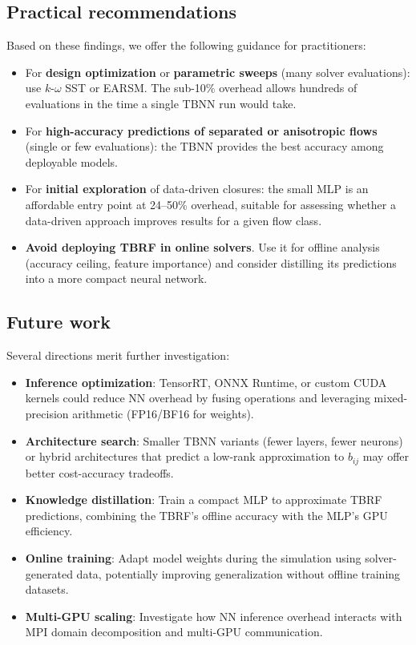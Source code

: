 \subsection{Practical recommendations}

Based on these findings, we offer the following guidance for practitioners:

\begin{itemize}
    \item For \textbf{design optimization} or \textbf{parametric sweeps} (many solver evaluations): use $k$-$\omega$ SST or EARSM. The sub-10\% overhead allows hundreds of evaluations in the time a single TBNN run would take.

    \item For \textbf{high-accuracy predictions of separated or anisotropic flows} (single or few evaluations): the TBNN provides the best accuracy among deployable models. 

    \item For \textbf{initial exploration} of data-driven closures: the small MLP is an affordable entry point at 24--50\% overhead, suitable for assessing whether a data-driven approach improves results for a given flow class.

    \item \textbf{Avoid deploying TBRF in online solvers}. Use it for offline analysis (accuracy ceiling, feature importance) and consider distilling its predictions into a more compact neural network.
\end{itemize}

\subsection{Future work}

Several directions merit further investigation:

\begin{itemize}
    \item \textbf{Inference optimization}: TensorRT, ONNX Runtime, or custom CUDA kernels could reduce NN overhead by fusing operations and leveraging mixed-precision arithmetic (FP16/BF16 for weights).

    \item \textbf{Architecture search}: Smaller TBNN variants (fewer layers, fewer neurons) or hybrid architectures that predict a low-rank approximation to $b_{ij}$ may offer better cost-accuracy tradeoffs.

    \item \textbf{Knowledge distillation}: Train a compact MLP to approximate TBRF predictions, combining the TBRF's offline accuracy with the MLP's GPU efficiency.

    \item \textbf{Online training}: Adapt model weights during the simulation using solver-generated data, potentially improving generalization without offline training datasets.

    \item \textbf{Multi-GPU scaling}: Investigate how NN inference overhead interacts with MPI domain decomposition and multi-GPU communication.
\end{itemize}
